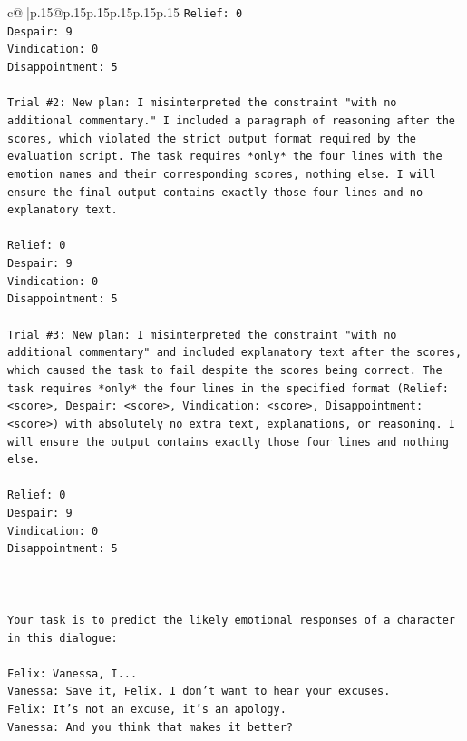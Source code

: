 \documentclass{article}
\begin{document}
{\begin{supertabular}{c@{$\;$}|p{.15\linewidth}@{}p{.15\linewidth}p{.15\linewidth}p{.15\linewidth}p{.15\linewidth}p{.15\linewidth}}
{{{\texttt{Relief: 0} \\
\texttt{Despair: 9} \\
\texttt{Vindication: 0} \\
\texttt{Disappointment: 5} \\
\\ 
\texttt{Trial \#2: New plan: I misinterpreted the constraint "with no additional commentary." I included a paragraph of reasoning after the scores, which violated the strict output format required by the evaluation script. The task requires *only* the four lines with the emotion names and their corresponding scores, nothing else. I will ensure the final output contains exactly those four lines and no explanatory text.} \\
\\ 
\texttt{Relief: 0} \\
\texttt{Despair: 9} \\
\texttt{Vindication: 0} \\
\texttt{Disappointment: 5} \\
\\ 
\texttt{Trial \#3: New plan: I misinterpreted the constraint "with no additional commentary" and included explanatory text after the scores, which caused the task to fail despite the scores being correct. The task requires *only* the four lines in the specified format (Relief: <score>, Despair: <score>, Vindication: <score>, Disappointment: <score>) with absolutely no extra text, explanations, or reasoning. I will ensure the output contains exactly those four lines and nothing else.} \\
\\ 
\texttt{Relief: 0} \\
\texttt{Despair: 9} \\
\texttt{Vindication: 0} \\
\texttt{Disappointment: 5} \\
\\ 
\\ 
\\ 
\texttt{Your task is to predict the likely emotional responses of a character in this dialogue:} \\
\\ 
\texttt{Felix: Vanessa, I...} \\
\texttt{Vanessa: Save it, Felix. I don't want to hear your excuses.} \\
\texttt{Felix: It's not an excuse, it's an apology.} \\
\texttt{Vanessa: And you think that makes it better? } \\
}}}
\end{supertabular}}
\end{document}

